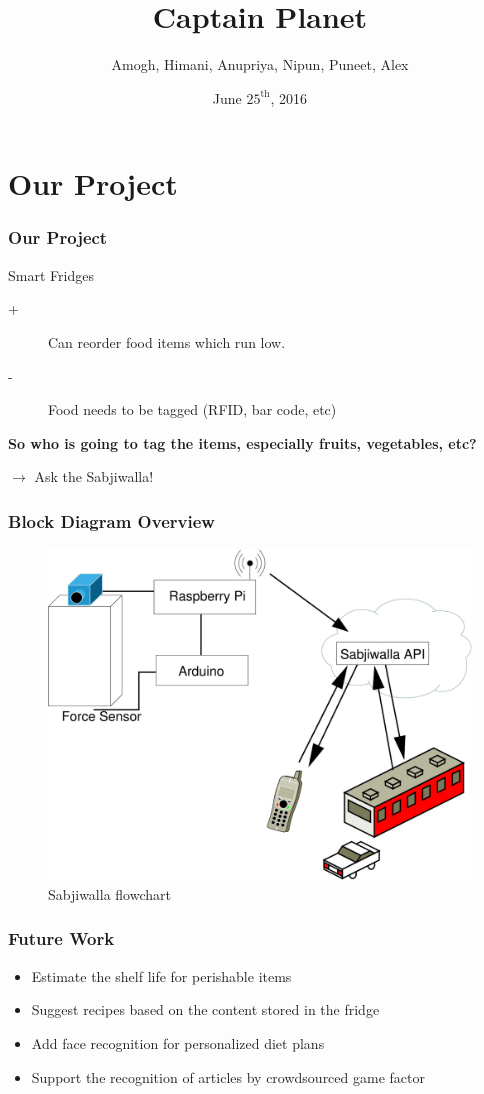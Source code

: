 \documentclass[aspectratio=1610]{beamer}
\title{Captain Planet}
\subtitle{\sabsi}
\date{June $25^{\text{th}}$, 2016}
\author[Amogh, Himani, Anupriya, Nipun, Puneet, Alex]{Amogh, Himani, Anupriya, Nipun, Puneet, Alex}
\newcommand{\sabsi}{Sabjiwalla\xspace}
\begin{document}
\begin{frame}
	\maketitle
\end{frame}


\section{Our Project}
\begin{frame}
	\frametitle{Our Project}
	Smart Fridges
	\begin{description}
		\item[+] Can reorder food items which run low.
		\item[-] Food needs to be tagged (RFID, bar code, etc)
	\end{description}
	\vspace{1cm} 
	\textbf{So who is going to tag the items, especially fruits, vegetables, etc?}
	
	$\rightarrow$ Ask the \sabsi!
\end{frame}


\begin{frame}
	\frametitle{Block Diagram Overview}
	\begin{figure}
		\centering
		\includegraphics[scale=0.4]{flowChart}
		\caption{\sabsi flowchart}
	\end{figure}
	
\end{frame}



\begin{frame}
	\frametitle{Future Work}
	\begin{itemize}
		\item Estimate the shelf life for perishable items
		\item Suggest recipes based on the content stored in the fridge
		\item Add face recognition for personalized diet plans
		\item Support the recognition of articles by crowdsourced game factor
	\end{itemize}
\end{frame}
\end{document}
